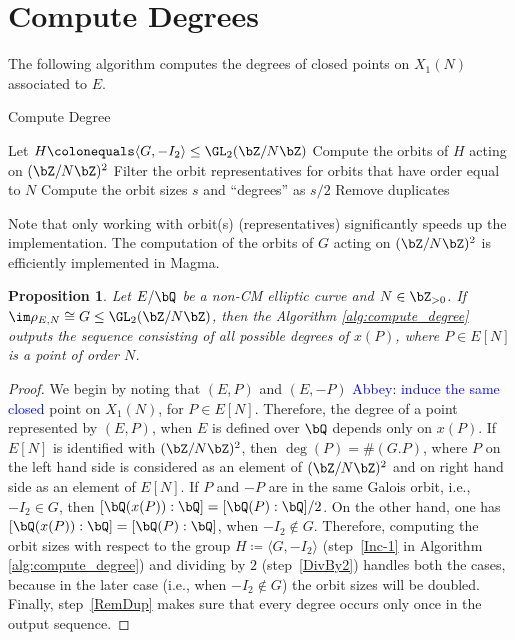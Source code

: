 \documentclass[11pt,reqno]{amsart}
\theoremstyle{plain}
\newtheorem{proposition}[theorem]{Proposition}
\theoremstyle{definition}
\newcommand{\Q}{\bQ}
\newcommand{\Z}{\bZ}
\newcommand{\abbey}[1]{\textcolor{blue}{Abbey: #1}}
\begin{document}
\section{Compute Degrees}

The following algorithm computes the degrees of closed points on $X_1(N)$ associated to $E$.


\begin{algorithm}[H] \caption{Compute Degree}\label{alg:compute_degree}
  \KwIn{$G\subseteq \GL_2(\Z/N\Z)$ such that $\im\rho_E=\pi^{-1}(G)$ and $N$ is the level}
  Let $H \colonequals \langle G, -I_2\rangle \leq \GL_2(\Z/N\Z)$\;
  Compute the orbits of $H$ acting on $(\Z/N\Z)^2$\label{Inc-1}\;
  Filter the orbit representatives for orbits that have order equal to $N$\;
  Compute the orbit sizes $s$ and ``degrees'' as $s/2$ \label{DivBy2}\;
  Remove duplicates\label{RemDup}\;
\end{algorithm}

Note that only working with orbit(s) (representatives) significantly speeds up the implementation. The computation of the orbits of $G$ acting on $(\Z/N\Z)^2$ is efficiently implemented in Magma.

\begin{proposition}
Let $E/\Q$ be a non-CM elliptic curve and $N \in \Z_{>0}$. If $\im \rho_{E,N} \cong G \leq \GL_2(\Z/N\Z)$, then the Algorithm \ref{alg:compute_degree} outputs the sequence consisting of all possible degrees of $x(P)$, where $P\in E[N]$ is a point of order $N$.
\end{proposition}
\begin{proof}
    We begin by noting that $(E, P)$ and $(E, -P)$ \abbey{induce the same closed} point on $X_1(N)$, for $P \in E[N]$. Therefore, the degree of
    a point represented by $(E, P)$, when
    $E$ is defined over $\Q$ depends only on $x(P)$.
    If $E[N]$ is identified with $(\Z/N\Z)^2$, then $\deg(P)=\# (G. P)$, where $P$ on the left hand side is considered as an element of $(\Z/N\Z)^2$
    and on right hand side as an element of $E[N]$.
    If $P$ and $-P$ are in the same Galois orbit, i.e., $-I_2\in G$, then $[\Q(x(P)):\Q]=[\Q(P):\Q]/2$. On the other hand, one has $[\Q(x(P)):\Q]=[\Q(P):\Q]$, when
    $-I_2\notin G$.
    Therefore, computing the orbit sizes with respect to the
    group $H\coloneqq \langle G, -I_2 \rangle$ (step~\ref{Inc-1} in Algorithm \ref{alg:compute_degree}) and dividing
    by $2$ (step~\ref{DivBy2}) handles both the cases, because in the later case (i.e., when $-I_2\notin G$) the orbit sizes will be doubled.
    Finally, step~\ref{RemDup} makes sure that every degree occurs only once in the output sequence.
\end{proof}
\end{document}
